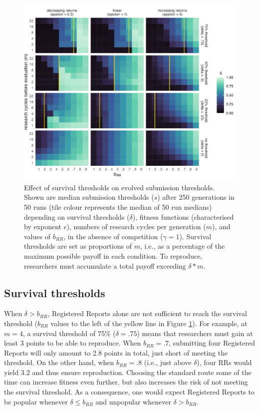\documentclass[
  ,man,mask,floatsintext]{apa6}
\begin{document}
\begin{figure}
\includegraphics[width=1\linewidth]{plots/plot_delta_tile_evo_epsilon_mako} \caption{Effect of survival thresholds on evolved submission thresholds. Shown are median submission thresholds (\(s\)) after 250 generations in 50 runs (tile colour represents the median of 50 run medians) depending on survival thresholds (\(\delta\)), fitness functions (characterised by exponent \(\epsilon\)), numbers of research cycles per generation (\(m\)), and values of \(b_{RR}\), in the absence of competition (\(\gamma = 1\)). Survival thresholds are set as proportions of \(m\), i.e., as a percentage of the maximum possible payoff in each condition. To reproduce, researchers must accumulate a total payoff exceeding \(\delta * m\).}\label{fig:deltaplot}
\end{figure}

\hypertarget{survival-thresholds}{%
\subsection{Survival thresholds}\label{survival-thresholds}}

When \(\delta > b_{RR}\), Registered Reports alone are not sufficient to reach the survival threshold (\(b_{RR}\) values to the left of the yellow line in Figure \ref{fig:deltaplot}).
For example, at \(m = 4\), a survival threshold of 75\% (\(\delta = .75\)) means that researchers must gain at least 3 points to be able to reproduce.
When \(b_{RR} = .7\), submitting four Registered Reports will only amount to 2.8 points in total, just short of meeting the threshold.
On the other hand, when \(b_{RR} = .8\) (i.e., just above \(\delta\)), four RRs would yield 3.2 and thus ensure reproduction.
Choosing the standard route some of the time can increase fitness even further, but also increases the risk of not meeting the survival threshold.
As a consequence, one would expect Registered Reports to be popular whenever \(\delta \leq b_{RR}\) and unpopular whenever \(\delta > b_{RR}\).
\end{document}
